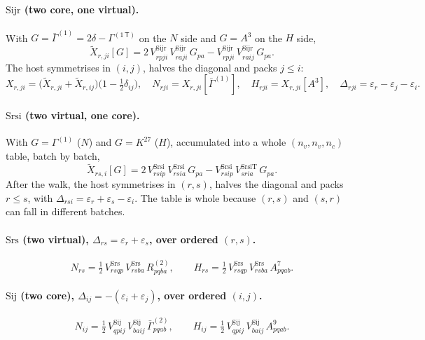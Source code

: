 \documentclass[11pt]{article}
\newcommand{\G}[1]{\Gamma^{(#1)}}
\newcommand{\Gb}[1]{\bar\Gamma^{(#1)}}
\newcommand{\eps}{\varepsilon}
\newcommand{\cls}[1]{\ensuremath{\mathrm{#1}}}
\begin{document}
\paragraph{\cls{Sijr} (two core, one virtual).} With $G = \Gb1 = 2\delta -
\G{1\,\mathsf T}$ on the $N$ side and $G = A^3$ on the $H$ side,
\begin{equation}
  \tilde X_{r,ji}[G] = 2\,V^{\cls{Sijr}}_{rpji}\,V^{\cls{Sijr}}_{raji}\,G_{pa}
                     - V^{\cls{Sijr}}_{rpji}\,V^{\cls{Sijr}}_{raij}\,G_{pa}.
\end{equation}
The host symmetrises in $(i,j)$, halves the diagonal and packs $j\le i$:
\begin{equation}
  X_{r,ji} = \bigl(\tilde X_{r,ji} + \tilde X_{r,ij}\bigr)\bigl(1 -
  \tfrac12\delta_{ij}\bigr),\quad
  N_{rji} = X_{r,ji}[\Gb1],\quad H_{rji} = X_{r,ji}[A^3],\quad
  \Delta_{rji} = \eps_r - \eps_j - \eps_i.
\end{equation}

\paragraph{\cls{Srsi} (two virtual, one core).} With $G = \G1$ ($N$) and $G =
K^{27}$ ($H$), accumulated into a whole $(n_v,n_v,n_c)$ table, batch by
batch,
\begin{equation}
  \tilde X_{rs,i}[G] = 2\,V^{\cls{Srsi}}_{rsip}\,V^{\cls{Srsi}}_{rsia}\,G_{pa}
     - V^{\cls{Srsi}}_{rsip}\,V^{\cls{SrsiT}}_{sria}\,G_{pa}.
\end{equation}
After the walk, the host symmetrises in $(r,s)$, halves the diagonal and
packs $r\le s$, with $\Delta_{rsi} = \eps_r+\eps_s-\eps_i$. The table is
whole because $(r,s)$ and $(s,r)$ can fall in different batches.

\paragraph{\cls{Srs} (two virtual), $\Delta_{rs} = \eps_r+\eps_s$, over
ordered $(r,s)$.}
\begin{equation}
  N_{rs} = \tfrac12\,V^{\cls{Srs}}_{rsqp}\,V^{\cls{Srs}}_{rsba}\,R^{(2)}_{pqba},
  \qquad
  H_{rs} = \tfrac12\,V^{\cls{Srs}}_{rsqp}\,V^{\cls{Srs}}_{rsba}\,A^{7}_{pqab}.
\end{equation}

\paragraph{\cls{Sij} (two core), $\Delta_{ij} = -(\eps_i+\eps_j)$, over
ordered $(i,j)$.}
\begin{equation}
  N_{ij} = \tfrac12\,V^{\cls{Sij}}_{qpij}\,V^{\cls{Sij}}_{baij}\,\Gb2_{pqab},
  \qquad
  H_{ij} = \tfrac12\,V^{\cls{Sij}}_{qpij}\,V^{\cls{Sij}}_{baij}\,A^{9}_{pqab}.
\end{equation}
\end{document}
